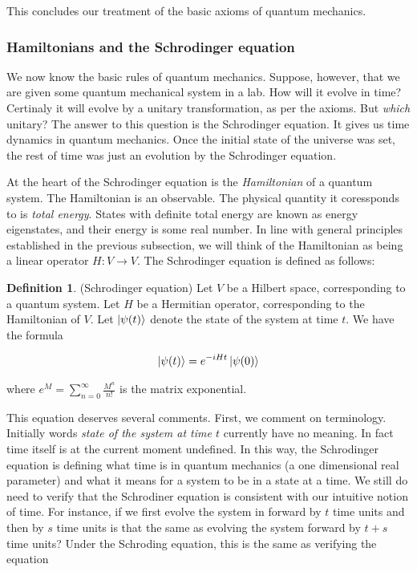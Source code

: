 \documentclass{article}
\theoremstyle{definition}
\newtheorem*{definition}{Definition}
\numberwithin{figure}{section}
\begin{document}
This concludes our treatment of the basic axioms of quantum mechanics.

\subsubsection{Hamiltonians and the Schrodinger equation}

We now know the basic rules of quantum mechanics. Suppose, however, that we are given some quantum mechanical system in a lab. How will it evolve in time? Certinaly it will evolve by a unitary transformation, as per the axioms. But \textit{which} unitary? The answer to this question is the Schrodinger equation. It gives us time dynamics in quantum mechanics. Once the initial state of the universe was set, the rest of time was just an evolution by the Schrodinger equation. 

At the heart of the Schrodinger equation is the \textit{Hamiltonian} of a quantum system. The Hamiltonian is an observable. The physical quantity it coressponds to is \textit{total energy}. States with definite total energy are known as energy eigenstates, and their energy is some real number. In line with general principles established in the previous subsection, we will think of the Hamiltonian as being a linear operator $H:V\to V$. The Schrodinger equation is defined as follows:

\begin{definition} (Schrodinger equation) Let $V$ be a Hilbert space, corresponding to a quantum system. Let $H$ be a Hermitian operator, corresponding to the Hamiltonian of $V$. Let $\ket{\psi(t)}$ denote the state of the system at time $t$. We have the formula

$$\ket{\psi(t)}=e^{-i H t}\ket{\psi(0)}$$

where $e^M=\sum_{n=0}^{\infty}\frac{M^n}{n!}$ is the matrix exponential.

\raggedleft\qedsymbol{}
\end{definition}

This equation deserves several comments. First, we comment on terminology. Initially words \textit{state of the system at time $t$} currently have no meaning. In fact time itself is at the current moment undefined. In this way, the Schrodinger equation is defining what time is in quantum mechanics (a one dimensional real parameter) and what it means for a system to be in a state at a time. We still do need to verify that the Schrodiner equation is consistent with our intuitive notion of time. For instance, if we first evolve the system in forward by $t$ time units and then by $s$ time units is that the same as evolving the system forward by $t+s$ time units? Under the Schroding equation, this is the same as verifying the equation
\end{document}
